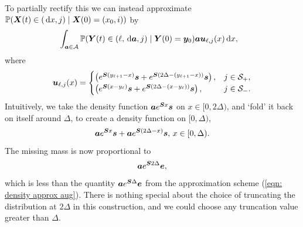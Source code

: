 
To partially rectify this we can instead approximate \(\mathbb P(\boldsymbol X(t)\in{}(\, \mathrm{d} x, j)\mid \boldsymbol X(0)=(x_0, i)) \) by
\begin{align}
	\label{eqn: density approx 3+}&
	\displaystyle\int_{\boldsymbol a \in\mathcal A}\mathbb P(\boldsymbol Y(t) \in(\ell, \, \mathrm{d} \boldsymbol a, j)\mid \boldsymbol Y(0)=\boldsymbol y_0) \boldsymbol a \boldsymbol u_{\ell,j}(x) \, \mathrm{d} x ,
\end{align}
{where}
\begin{align}
		\boldsymbol u_{\ell,j}(x) = \begin{cases}
			\left(e^{ \boldsymbol{S}(y_{\ell+1}-x)} \boldsymbol s + e^{ \boldsymbol{S}(2\Delta-(y_{\ell+1}-x))} \boldsymbol s\right), & j\in\mathcal{S}_+, \\ 
			\left(e^{ \boldsymbol{S}(x-y_\ell)} \boldsymbol s+e^{ \boldsymbol{S}(2\Delta-(x-y_\ell))} \boldsymbol s\right), & j\in\mathcal{S}_-. \\ 
		\end{cases}\label{eqn: density approx 3+a}
\end{align}
Intuitively, we take the density function \(\boldsymbol ae^{\boldsymbol{S}x}\boldsymbol s\) on \(x \in{}[0,2\Delta)\), and `fold' it back on itself around \(\Delta\), to create a density function on \([0,\Delta)\), 
\[\boldsymbol ae^{\boldsymbol{S}x}\boldsymbol s +\boldsymbol ae^{\boldsymbol{S}(2\Delta-x)}\boldsymbol s,\, x \in{}[0,\Delta).\]
The missing mass is now proportional to 
\[\boldsymbol a e^{\boldsymbol S 2\Delta}\boldsymbol e,\]
which is less than the quantity \(\boldsymbol a e^{\boldsymbol S \Delta}\boldsymbol e\) from the approximation scheme (\ref{eqn: density approx aug}). There is nothing special about the choice of truncating the distribution at \(2\Delta\) in this construction, and we could choose any truncation value greater than \(\Delta\).

